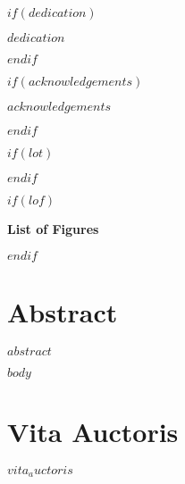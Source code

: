 \documentclass[phdthesis,12pt,final]{wuthesis}
\begin{document}
$if(dedication)$
\cleardoublepage
\begin{thesisdedicationpage}
$dedication$
\end{thesisdedicationpage}
$endif$

$if(acknowledgements)$
\cleardoublepage
\begin{thesisacknowledgments}
$acknowledgements$
\end{thesisacknowledgments}
$endif$

\cleardoublepage
\begin{singlespace}
\setcounter{page}{2}
\renewcommand*\contentsname{Table of Contents}
\tableofcontents
\end{singlespace}

$if(lot)$
\cleardoublepage
{}
{}
\begin{center}
\end{center}
\vspace{1em}
\begin{singlespace}
\listoftables
\end{singlespace}
$endif$

$if(lof)$
\cleardoublepage
{}
{}
\begin{center}
\maintitlesize\textbf{List of Figures}
\end{center}
\vspace{1em}
\begin{singlespace}
\listoffigures
\end{singlespace}
$endif$


\cleardoublepage
{}
{}
\chapter*{Abstract}
\begin{doublespace}
$abstract$
\end{doublespace}

\cleardoublepage
{}
\setcounter{page}{1}

$body$

\backmatter

\cleardoublepage
{}
{}
\chapter*{Vita Auctoris}
\begin{doublespace}
$vita_auctoris$
\end{doublespace}
\end{document}

